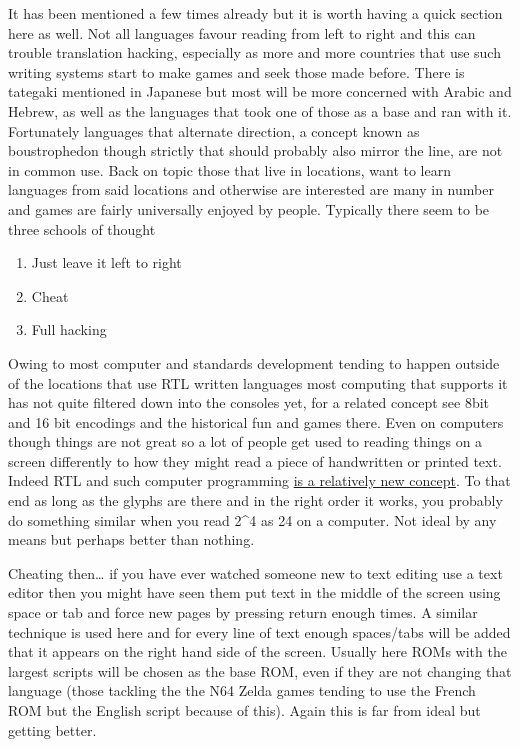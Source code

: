 \documentclass[
]{book}
\providecommand{\tightlist}{%
  \setlength{\itemsep}{0pt}\setlength{\parskip}{0pt}}
\begin{document}
It has been mentioned a few times already but it is worth having a quick section here as well. Not all languages favour reading from left to right and this can trouble translation hacking, especially as more and more countries that use such writing systems start to make games and seek those made before. There is tategaki mentioned in Japanese but most will be more concerned with Arabic and Hebrew, as well as the languages that took one of those as a base and ran with it. Fortunately languages that alternate direction, a concept known as boustrophedon though strictly that should probably also mirror the line, are not in common use. Back on topic those that live in locations, want to learn languages from said locations and otherwise are interested are many in number and games are fairly universally enjoyed by people. Typically there seem to be three schools of thought

\begin{enumerate}
\def\labelenumi{\arabic{enumi}.}
\tightlist
\item
  Just leave it left to right
\item
  Cheat
\item
  Full hacking
\end{enumerate}

Owing to most computer and standards development tending to happen outside of the locations that use RTL written languages most computing that supports it has not quite filtered down into the consoles yet, for a related concept see 8bit and 16 bit encodings and the historical fun and games there. Even on computers though things are not great so a lot of people get used to reading things on a screen differently to how they might read a piece of handwritten or printed text. Indeed RTL and such computer programming \href{https://github.com/nasser/---}{is a relatively new concept}. To that end as long as the glyphs are there and in the right order it works, you probably do something similar when you read 2\^{}4 as 24 on a computer. Not ideal by any means but perhaps better than nothing.

Cheating then\ldots{} if you have ever watched someone new to text editing use a text editor then you might have seen them put text in the middle of the screen using space or tab and force new pages by pressing return enough times. A similar technique is used here and for every line of text enough spaces/tabs will be added that it appears on the right hand side of the screen. Usually here ROMs with the largest scripts will be chosen as the base ROM, even if they are not changing that language (those tackling the the N64 Zelda games tending to use the French ROM but the English script because of this). Again this is far from ideal but getting better.
\end{document}
